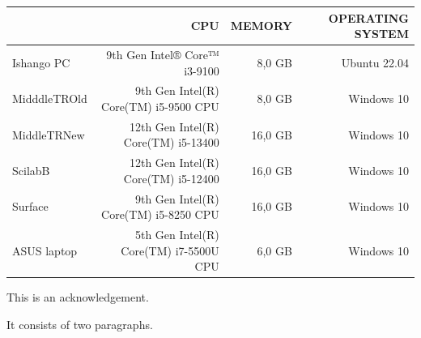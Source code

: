 \documentclass[12pt,halfline,a4paper,]{ouparticle}
\begin{document}
\begin{tabular}{l|r|r|r}
\hline
  & CPU & MEMORY & OPERATING SYSTEM\\
\hline
Ishango PC &  9th Gen Intel® Core™ i3-9100  & 8,0 GB &  Ubuntu 22.04\\
\hline
MidddleTROld & 9th Gen Intel(R) Core(TM) i5-9500 CPU & 8,0 GB &  Windows 10\\
\hline
MiddleTRNew & 12th Gen Intel(R) Core(TM) i5-13400 & 16,0 GB &  Windows 10\\
\hline
ScilabB &  12th Gen Intel(R) Core(TM) i5-12400 &  16,0 GB  &  Windows 10\\
\hline
Surface &  9th Gen Intel(R) Core(TM) i5-8250 CPU &  16,0 GB  &  Windows 10\\
\hline
ASUS laptop &  5th Gen Intel(R) Core(TM) i7-5500U CPU &  6,0 GB  &  Windows 10\\
\end{tabular}

\hfill\break


\begin{notes}[Acknowledgements]
This is an acknowledgement.

It consists of two paragraphs.
\end{notes}
\end{document}
